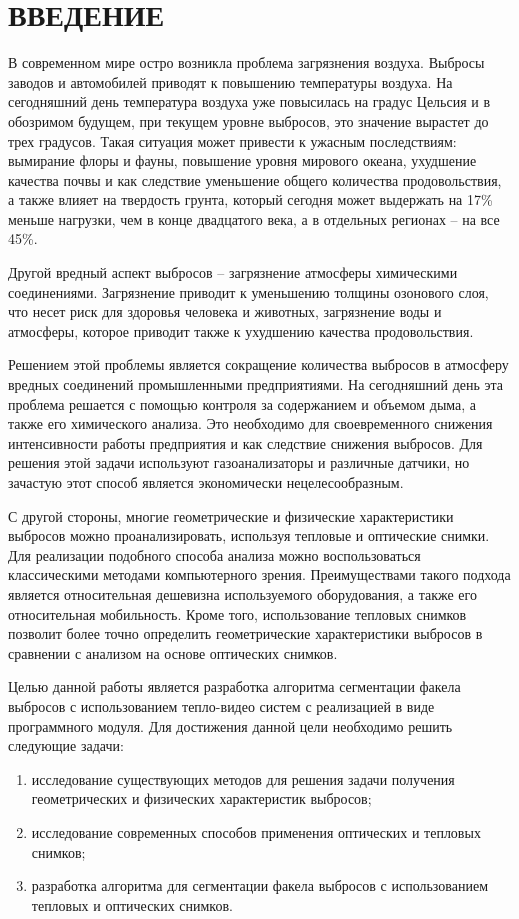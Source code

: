\documentclass[14pt, a4paper]{extreport}
\begin{document}
\firstpage
\taskpage
\newpage
\annotationpage
\renewcommand\contentsname{ОГЛАВЛЕНИЕ} 
\tableofcontents
\thispagestyle{empty}
\chapter* {ВВЕДЕНИЕ} 
	В современном мире остро возникла проблема загрязнения воздуха. Выбросы заводов и автомобилей приводят к повышению температуры воздуха. На сегодняшний день температура воздуха уже повысилась на градус Цельсия и в обозримом будущем, при текущем уровне выбросов, это значение вырастет до трех градусов. Такая ситуация может привести к ужасным последствиям: вымирание флоры и фауны, повышение уровня мирового океана, ухудшение качества почвы и как следствие уменьшение общего количества продовольствия, а также влияет на твердость грунта, который сегодня может выдержать на 17\% меньше нагрузки, чем в конце двадцатого века, а в отдельных регионах -- на все 45\%. 
	
	Другой вредный аспект выбросов -- загрязнение атмосферы химическими соединениями. Загрязнение приводит к уменьшению толщины озонового слоя, что несет риск для здоровья человека и животных, загрязнение воды и атмосферы, которое приводит также к ухудшению качества продовольствия. 
	
	Решением этой проблемы является сокращение количества выбросов в атмосферу вредных соединений промышленными предприятиями. На сегодняшний день эта проблема решается с помощью контроля за содержанием и объемом дыма, а также его химического анализа. Это необходимо для своевременного снижения интенсивности работы предприятия и как следствие снижения выбросов. Для решения этой задачи используют газоанализаторы и различные датчики, но зачастую этот способ является экономически нецелесообразным. 
	
	С другой стороны, многие геометрические и физические характеристики выбросов можно проанализировать, используя тепловые и оптические снимки. Для реализации подобного способа анализа можно воспользоваться классическими методами компьютерного зрения. Преимуществами такого подхода является относительная дешевизна используемого оборудования, а также его относительная мобильность. Кроме того, использование тепловых снимков позволит более точно определить геометрические характеристики выбросов в сравнении с анализом на основе оптических снимков.
	
	Целью данной работы является разработка алгоритма сегментации факела выбросов с использованием тепло-видео систем с реализацией в виде программного модуля. Для достижения данной цели необходимо решить следующие задачи:
	\begin{enumerate}[label={\arabic*)}]
		\item исследование существующих методов для решения задачи получения геометрических и физических характеристик выбросов;
		\item исследование современных способов применения оптических и тепловых снимков;
		\item разработка алгоритма для сегментации факела выбросов с использованием тепловых и оптических снимков.
	\end{enumerate}
\end{document}
